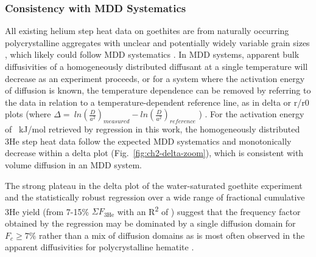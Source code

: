 \subsubsection{Consistency with MDD Systematics}\label{consistency-with-mdd-systematics}

All existing helium step heat data on goethites are from naturally occurring
polycrystalline aggregates with unclear and potentially widely variable
grain sizes \citep{monteiro2017,farley2024}, which likely could
follow MDD systematics \citep{farley2018}. In MDD systems, apparent bulk diffusivities of a homogeneously distributed
diffusant at a single temperature will decrease as an experiment
proceeds, or for a system where the activation energy of diffusion is known, the temperature dependence can be removed by referring to the data
in relation to a temperature-dependent reference line, as in delta or r/r0 plots (where
\(\Delta = \ ln\left( \frac{D}{a^{2}} \right)_{measured} - ln\left( \frac{D}{a^{2}} \right)_{reference}\)
) \citep{lovera1991,farley2018}. For the activation energy of \ChTwoEa{}~kJ/mol
retrieved by regression in this work, the homogeneously distributed 3He
step heat data follow the expected MDD systematics and monotonically
decrease within a delta plot (Fig.~\ref{fig:ch2-delta-zoom}), which is consistent with
volume diffusion in an MDD system. 

The strong plateau in the delta plot of the water-saturated goethite experiment and the statistically robust regression
over a wide range of fractional cumulative 3He yield (from 7-15\% $\Sigma F_{3\mathrm{He}}$
with an R\textsuperscript{2} of \ChTwoRtwo) suggest that the frequency
factor obtained by the regression may be dominated by a single
diffusion domain for $F_c \ge 7\%$ rather than a mix of diffusion domains as is most
often observed in the apparent diffusivities for polycrystalline
hematite \citep{farley2018}.


